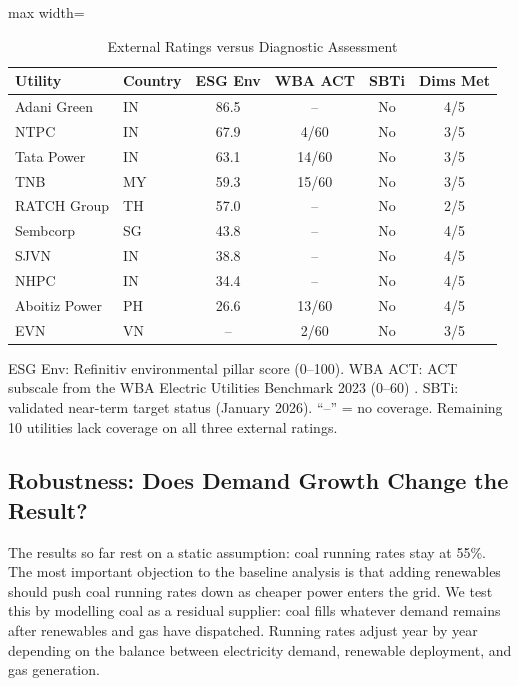 \documentclass[review,3p,authoryear]{elsarticle}
\begin{document}
\begin{table}[H]
\centering
\caption{External Ratings versus Diagnostic Assessment}
\label{tab:ratings}
\small
\begin{adjustbox}{max width=\linewidth}
\begin{tabular}{@{}llcccc@{}}
\toprule
\textbf{Utility} & \textbf{Country} & \textbf{ESG Env} & \textbf{WBA ACT} & \textbf{SBTi} & \textbf{Dims Met} \\
\midrule
Adani Green       & IN & 86.5 & --    & No & 4/5 \\
NTPC              & IN & 67.9 & 4/60  & No & 3/5 \\
Tata Power        & IN & 63.1 & 14/60 & No & 3/5 \\
TNB               & MY & 59.3 & 15/60 & No & 3/5 \\
RATCH Group       & TH & 57.0 & --    & No & 2/5 \\
Sembcorp          & SG & 43.8 & --    & No & 4/5 \\
SJVN              & IN & 38.8 & --    & No & 4/5 \\
NHPC              & IN & 34.4 & --    & No & 4/5 \\
Aboitiz Power     & PH & 26.6 & 13/60 & No & 4/5 \\
EVN               & VN & --   & 2/60  & No & 3/5 \\
\bottomrule
\end{tabular}
\end{adjustbox}
\begin{flushleft}
\footnotesize{ESG Env: Refinitiv environmental pillar score (0--100). WBA ACT: ACT subscale from the WBA Electric Utilities Benchmark 2023 (0--60) \citep{WBA2024}. SBTi: validated near-term target status (January 2026). ``--'' = no coverage. Remaining 10 utilities lack coverage on all three external ratings.}
\end{flushleft}
\end{table}

\subsection{Robustness: Does Demand Growth Change the Result?}
\label{sec:robustness}

The results so far rest on a static assumption: coal running rates stay at 55\%. The most important objection to the baseline analysis is that adding renewables should push coal running rates down as cheaper power enters the grid. We test this by modelling coal as a residual supplier: coal fills whatever demand remains after renewables and gas have dispatched. Running rates adjust year by year depending on the balance between electricity demand, renewable deployment, and gas generation.
\end{document}
